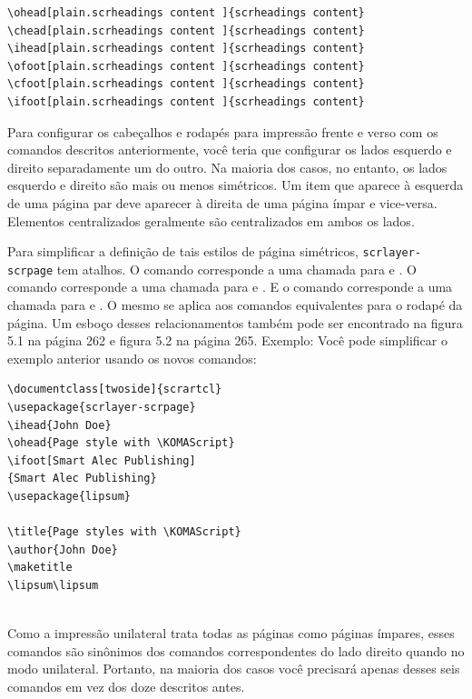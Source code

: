\begin{verbatim}
\ohead[plain.scrheadings content ]{scrheadings content}
\chead[plain.scrheadings content ]{scrheadings content}
\ihead[plain.scrheadings content ]{scrheadings content}
\ofoot[plain.scrheadings content ]{scrheadings content}
\cfoot[plain.scrheadings content ]{scrheadings content}
\ifoot[plain.scrheadings content ]{scrheadings content} 
\end{verbatim}

Para configurar os cabeçalhos e rodapés para impressão frente e verso com os comandos descritos anteriormente, você teria que configurar os lados esquerdo e direito separadamente um do outro. Na maioria dos casos, no entanto, os lados esquerdo e direito são mais ou menos simétricos. Um item que aparece à esquerda de uma página par deve aparecer à direita de uma página ímpar e vice-versa. Elementos centralizados geralmente são centralizados em ambos os lados.

Para simplificar a definição de tais estilos de página simétricos, \texttt{scrlayer-scrpage} tem atalhos. O comando  corresponde a uma chamada para  e . O comando  corresponde a uma chamada para  e . E o comando  corresponde a uma chamada para  e . O mesmo se aplica aos comandos equivalentes para o rodapé da página. Um esboço desses relacionamentos também pode ser encontrado na figura 5.1 na página 262 e figura 5.2 na página 265.
Exemplo: Você pode simplificar o exemplo anterior usando os novos comandos:
\begin{verbatim}
\documentclass[twoside]{scrartcl}
\usepackage{scrlayer-scrpage}
\ihead{John Doe}
\ohead{Page style with \KOMAScript}
\ifoot[Smart Alec Publishing]
{Smart Alec Publishing}
\usepackage{lipsum}

\title{Page styles with \KOMAScript}
\author{John Doe}
\maketitle
\lipsum\lipsum
    
\end{verbatim}

Como a impressão unilateral trata todas as páginas como páginas ímpares, esses comandos são sinônimos dos comandos correspondentes do lado direito quando no modo unilateral. Portanto, na maioria dos casos você precisará apenas desses seis comandos em vez dos doze descritos antes.

